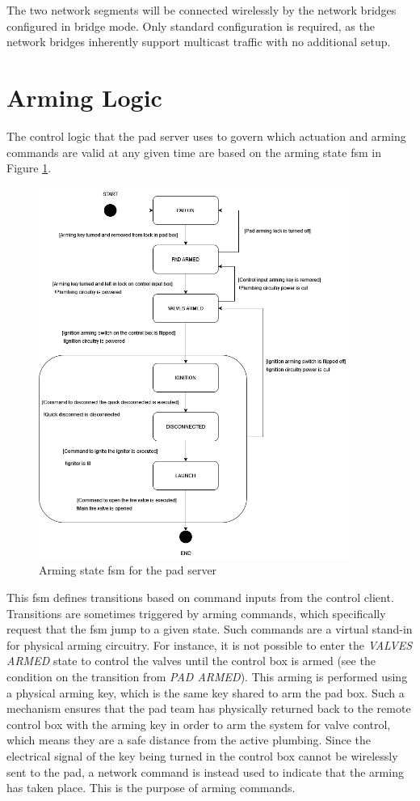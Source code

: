 The two network segments will be connected wirelessly by the network bridges configured in bridge mode. Only standard
configuration is required, as the network bridges inherently support multicast traffic with no additional setup.

\section{Arming Logic}

The control logic that the pad server uses to govern which actuation and arming commands are valid at any given time
are based on the arming state \gls{fsm} in Figure \ref{fig:arming-fsm}.

\begin{figure}[H]
    \center
    \includegraphics[width=4in]{assets/diagrams/Hybrid_Control_FSM.png}
    \caption{Arming state \gls{fsm} for the pad server}
    \label{fig:arming-fsm}
\end{figure}

This \gls{fsm} defines transitions based on command inputs from the control client. Transitions are sometimes triggered
by arming commands, which specifically request that the \gls{fsm} jump to a given state. Such commands are a virtual
stand-in for physical arming circuitry. For instance, it is not possible to enter the \textit{VALVES ARMED} state to
control the valves until the control box is armed (see the condition on the transition from \textit{PAD ARMED}). This
arming is performed using a physical arming key, which is the same key shared to arm the pad box. Such a mechanism
ensures that the pad team has physically returned back to the remote control box with the arming key in order to arm
the system for valve control, which means they are a safe distance from the active plumbing. Since the electrical
signal of the key being turned in the control box cannot be wirelessly sent to the pad, a network command is instead
used to indicate that the arming has taken place. This is the purpose of arming commands.

